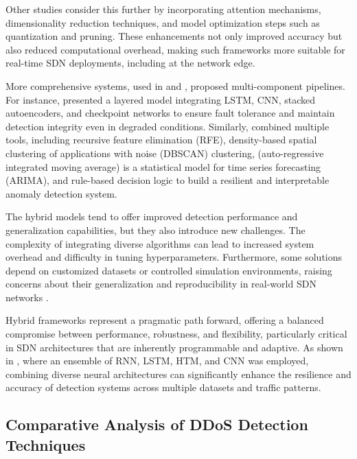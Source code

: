 \documentclass[ASNA,twocolumn]{USG} %
\begin{document}
Other studies \cite{habib2024time, xu2025deep, min2023ddos} consider this further by incorporating attention mechanisms, dimensionality reduction techniques, and model optimization steps such as quantization and pruning. These enhancements not only improved accuracy but also reduced computational overhead, making such frameworks more suitable for real-time SDN deployments, including at the network edge.

More comprehensive systems, used in \cite{nazir2024deep} and \cite{ma2023real}, proposed multi-component pipelines. For instance, \cite{khaleel2023ddos} presented a layered model integrating LSTM, CNN, stacked autoencoders, and checkpoint networks to ensure fault tolerance and maintain detection integrity even in degraded conditions. Similarly, \cite{ma2023real} combined multiple tools, including recursive feature elimination (RFE), density-based spatial clustering of applications with noise (DBSCAN) clustering, (auto-regressive integrated moving average) is a statistical model for time series forecasting (ARIMA), and rule-based decision logic to build a resilient and interpretable anomaly detection system.

The hybrid models tend to offer improved detection performance and generalization capabilities, but they also introduce new challenges. The complexity of integrating diverse algorithms can lead to increased system overhead and difficulty in tuning hyperparameters. Furthermore, some solutions depend on customized datasets or controlled simulation environments, raising concerns about their generalization and reproducibility in real-world SDN networks \cite{bhayo2021time, nazir2024deep}.

Hybrid frameworks represent a pragmatic path forward, offering a balanced compromise between performance, robustness, and flexibility, particularly critical in SDN architectures that are inherently programmable and adaptive. As shown in \cite{ma2023real}, where an ensemble of RNN, LSTM, HTM, and CNN was employed, combining diverse neural architectures can significantly enhance the resilience and accuracy of detection systems across multiple datasets and traffic patterns. 



\subsection{Comparative Analysis of DDoS Detection Techniques}
\end{document}
